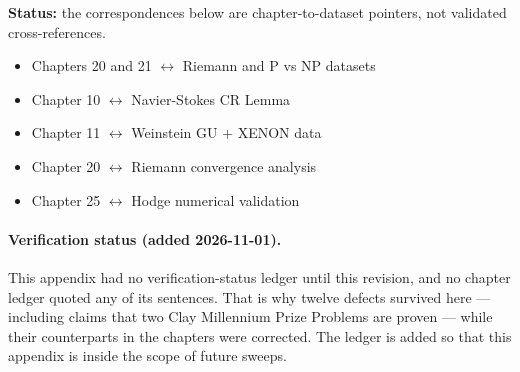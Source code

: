 \textbf{Status:} the correspondences below are chapter-to-dataset pointers, not
validated cross-references.

\begin{itemize}
\item Chapters 20 and 21 $\leftrightarrow$ Riemann and P vs NP datasets
\item Chapter 10 $\leftrightarrow$ Navier-Stokes CR Lemma
\item Chapter 11 $\leftrightarrow$ Weinstein GU + XENON data
\item Chapter 20 $\leftrightarrow$ Riemann convergence analysis
\item Chapter 25 $\leftrightarrow$ Hodge numerical validation
\end{itemize}


\label{sec:appH-verification-status}
\paragraph{Verification status (added 2026-11-01).}
This appendix had no verification-status ledger until this revision, and no
chapter ledger quoted any of its sentences. That is why twelve defects survived
here --- including claims that two Clay Millennium Prize Problems are proven ---
while their counterparts in the chapters were corrected. The ledger is added so
that this appendix is inside the scope of future sweeps.

